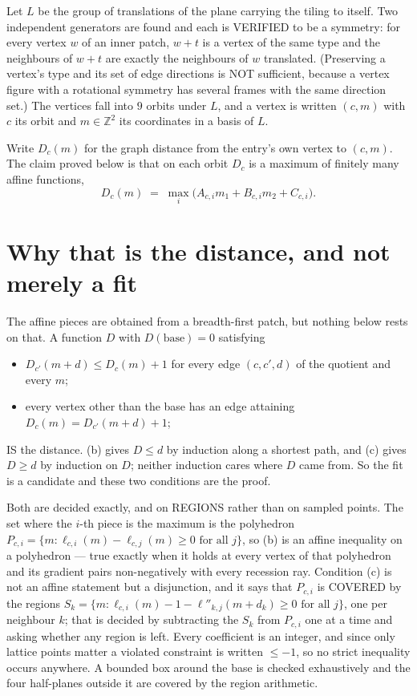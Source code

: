\documentclass[11pt,a4paper]{article}
\theoremstyle{plain}
\theoremstyle{definition}
\begin{document}
Let $L$ be the group of translations of the plane carrying the tiling to itself. Two
independent generators are found and each is VERIFIED to be a symmetry: for every vertex $w$
of an inner patch, $w+t$ is a vertex of the same type and the neighbours of $w+t$ are exactly
the neighbours of $w$ translated. (Preserving a vertex's type and its set of edge directions
is NOT sufficient, because a vertex figure with a rotational symmetry has several frames with
the same direction set.) The vertices fall into $9$ orbits under $L$, and a vertex is
written $(c,m)$ with $c$ its orbit and $m\in\mathbb{Z}^2$ its coordinates in a basis of $L$.

Write $D_c(m)$ for the graph distance from the entry's own vertex to $(c,m)$. The claim proved
below is that on each orbit $D_c$ is a maximum of finitely many affine functions,
\[
D_c(m)\;=\;\max_i\bigl(A_{c,i}m_1+B_{c,i}m_2+C_{c,i}\bigr).
\]

\section{Why that is the distance, and not merely a fit}

The affine pieces are obtained from a breadth-first patch, but nothing below rests on that. A
function $D$ with $D(\text{base})=0$ satisfying

\begin{itemize}
\item[(b)] $D_{c'}(m+d)\le D_c(m)+1$ for every edge $(c,c',d)$ of the quotient and every $m$;
\item[(c)] every vertex other than the base has an edge attaining $D_c(m)=D_{c'}(m+d)+1$;
\end{itemize}

IS the distance. (b) gives $D\le d$ by induction along a shortest path, and (c) gives $D\ge d$
by induction on $D$; neither induction cares where $D$ came from. So the fit is a candidate and
these two conditions are the proof.

Both are decided exactly, and on REGIONS rather than on sampled points. The set where the
$i$-th piece is the maximum is the polyhedron
$P_{c,i}=\{m: \ell_{c,i}(m)-\ell_{c,j}(m)\ge0 \text{ for all } j\}$, so (b) is an
affine inequality on a polyhedron --- true exactly when it holds at every vertex of that
polyhedron and its gradient pairs non-negatively with every recession ray. Condition (c) is
not an affine statement but a disjunction, and it says that $P_{c,i}$ is COVERED by the
regions
$S_k=\{m:\ell_{c,i}(m)-1-\ell''_{k,j}(m+d_k)\ge0\text{ for all }j\}$, one per
neighbour $k$; that is decided by subtracting the $S_k$ from $P_{c,i}$ one at a time and
asking whether any region is left. Every coefficient is an integer, and since only lattice
points matter a violated constraint is written $\le-1$, so no strict inequality occurs
anywhere. A bounded box around the base is checked exhaustively and the four half-planes
outside it are covered by the region arithmetic.
\end{document}
